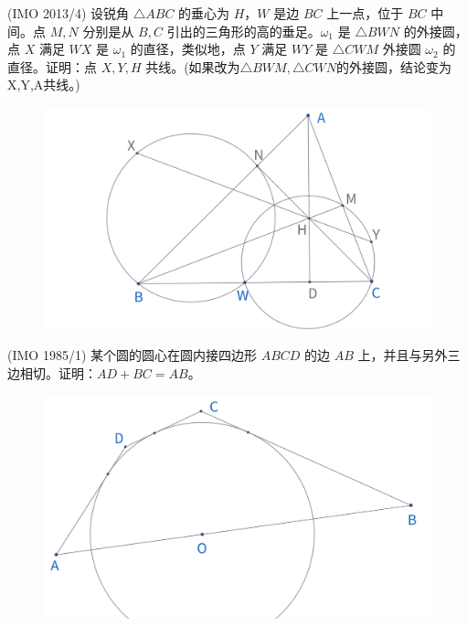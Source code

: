\newpage 
\begin{exercise}
(IMO 2013/4) 设锐角 $\triangle ABC$ 的垂心为 $H$，$W$ 是边 $BC$ 上一点，位于 $BC$ 中间。点 $M, N$ 分别是从 $B, C$ 引出的三角形的高的垂足。$\omega_1$ 是 $\triangle BWN$ 的外接圆，点 $X$ 满足 $WX$ 是 $\omega_1$ 的直径，类似地，点 $Y$ 满足 $WY$ 是 $\triangle CWM$ 外接圆 $\omega_2$ 的直径。证明：点 $X, Y, H$ 共线。(如果改为$\triangle BWM, \triangle CWN$的外接圆，结论变为X,Y,A共线。)
\end{exercise}
\begin{figure}[H]
    \centering
    \includegraphics[width=0.7\linewidth]{figures/exercises/015.png}
\end{figure}


\begin{exercise}
(IMO 1985/1) 某个圆的圆心在圆内接四边形 $ABCD$ 的边 ${AB}$ 上，并且与另外三边相切。证明：$AD + BC = AB$。
\end{exercise}
\begin{figure}[H]
    \centering
    \includegraphics[width=0.7\linewidth]{figures/exercises/016.png}
\end{figure}


\newpage 

